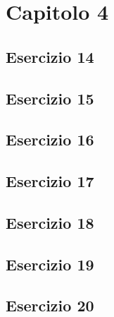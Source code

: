 \section{\textbf{Capitolo 4}}
\subsection{Esercizio 14}

\subsection{Esercizio 15}

\subsection{Esercizio 16}

\subsection{Esercizio 17}

\subsection{Esercizio 18}

\subsection{Esercizio 19}

\subsection{Esercizio 20}

